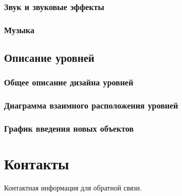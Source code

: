 \documentclass{article}
\begin{document}
\subsubsection{Звук и звуковые эффекты}


\subsubsection{Музыка}


\subsection{Описание уровней}
\subsubsection{Общее описание дизайна уровней}


\subsubsection{Диаграмма взаимного расположения уровней}


\subsubsection{График введения новых объектов}


\newpage

\section{Контакты}
Контактная информация для обратной связи.
\end{document}
